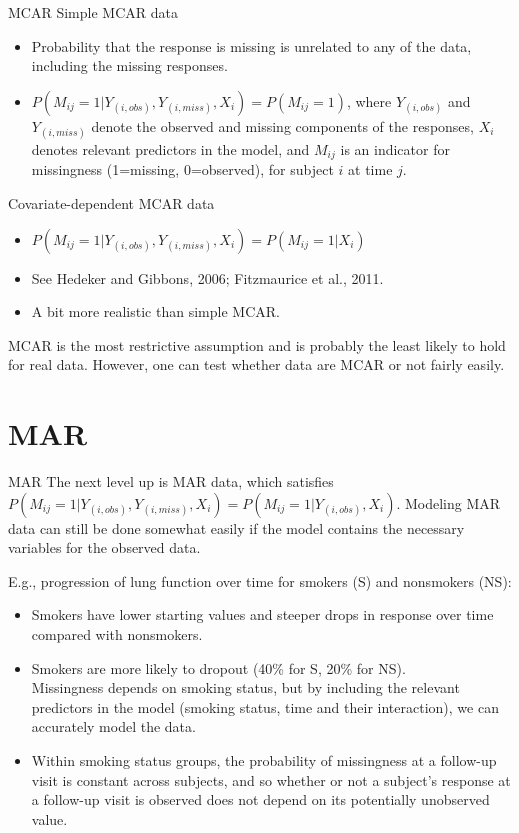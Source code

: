 \documentclass[
  9pt,
  ignorenonframetext,
]{beamer}
\begin{document}
\begin{frame}{MCAR}
\protect\hypertarget{mcar-1}{}
Simple MCAR data

\begin{itemize}
\item
  Probability that the response is missing is unrelated to any of the
  data, including the missing responses.
\item
  \(P(M_{ij}=1|Y_{(i,obs)},Y_{(i,miss)}, X_i)=P(M_{ij}=1)\), where
  \(Y_{(i,obs)}\) and \(Y_{(i,miss)}\) denote the observed and missing
  components of the responses, \(X_i\) denotes relevant predictors in
  the model, and \(M_{ij}\) is an indicator for missingness (1=missing,
  0=observed), for subject \(i\) at time \(j\).
\end{itemize}

Covariate-dependent MCAR data

\begin{itemize}
\item
  \(P(M_{ij}=1|Y_{(i,obs)},Y_{(i,miss)},X_i)=P(M_{ij}=1|X_i)\)
\item
  See Hedeker and Gibbons, 2006; Fitzmaurice et al., 2011.
\item
  A bit more realistic than simple MCAR.
\end{itemize}

MCAR is the most restrictive assumption and is probably the least likely
to hold for real data. However, one can test whether data are MCAR or
not fairly easily.
\end{frame}

\hypertarget{mar}{%
\section{MAR}\label{mar}}

\begin{frame}{MAR}
\protect\hypertarget{mar-1}{}
The next level up is MAR data, which satisfies
\(P(M_{ij}=1|Y_{(i,obs)},Y_{(i,miss)},X_i)=P(M_{ij}=1|Y_{(i,obs)},X_i)\).
Modeling MAR data can still be done somewhat easily if the model
contains the necessary variables for the observed data.

E.g., progression of lung function over time for smokers (S) and
nonsmokers (NS):

\begin{itemize}
\item
  Smokers have lower starting values and steeper drops in response over
  time compared with nonsmokers.
\item
  Smokers are more likely to dropout (40\% for S, 20\% for NS).\\
  Missingness depends on smoking status, but by including the relevant
  predictors in the model (smoking status, time and their interaction),
  we can accurately model the data.
\item
  Within smoking status groups, the probability of missingness at a
  follow-up visit is constant across subjects, and so whether or not a
  subject's response at a follow-up visit is observed does not depend on
  its potentially unobserved value.
\end{itemize}
\end{frame}
\end{document}
